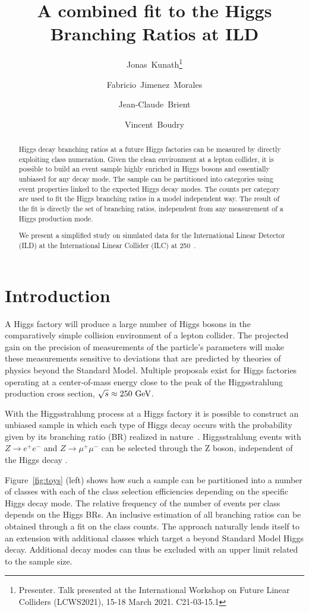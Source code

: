 \documentclass[11pt, hidelinks, a4paper]{scrartcl}
\title{\textbf{A combined fit to the Higgs Branching Ratios at ILD} }
\author{Jonas~Kunath\thanks{Presenter.
    Talk presented at the International Workshop on Future Linear Colliders (LCWS2021),
    15-18 March 2021. C21-03-15.1}
}
\author{Fabricio~Jimenez~Morales}
\author{Jean-Claude~Brient}
\author{Vincent~Boudry}
\affil{Laboratoire Leprince-Ringuet CNRS, \'Ecole Polytechnique,\hspace{2em} Institut Polytechnique de Paris, France}
\date{}
\newcommand{\eV}{\text{e\kern-0.15ex V}\xspace}
\newcommand{\GeV}{\text{G\eV}\xspace}
\begin{document}
\maketitle
\begin{abstract}
Higgs decay branching ratios at a future Higgs factories
can be measured by directly exploiting class numeration.
Given the clean environment at a lepton collider,
it is possible to build an event sample highly enriched in Higgs bosons
and essentially unbiased for any decay mode.
The sample can be partitioned into categories using event properties
linked to the expected Higgs decay modes.
The counts per category are used to fit
the Higgs branching ratios in a model independent way.
The result of the fit is directly the set of branching ratios,
independent from any measurement of a Higgs production mode.

We present a simplified study on simulated data
for the International Linear Detector (ILD)
at the International Linear Collider (ILC) at 250~\GeV.
\end{abstract}

\section{Introduction}
A Higgs factory will produce a large number of Higgs bosons
in the comparatively simple collision environment of a lepton collider.
The projected gain on the precision of measurements of the particle's parameters
will make these measurements sensitive to deviations
that are predicted by theories of physics beyond the Standard Model.
Multiple proposals exist for Higgs factories operating at a center-of-mass energy
close to the peak of the Higgsstrahlung production cross section,
$\sqrt{s}\approx250~\GeV$.

With the Higgsstrahlung process at a Higgs factory
it is possible to construct an unbiased sample
in which each type of Higgs decay occurs with the probability given by
its branching ratio (BR) realized in nature~\cite{HiggsBR_LCWS2019}.
Higgsstrahlung events with $Z \to e^+ e^-$ and $Z \to \mu^+ \mu^-$
can be selected through
the Z boson, independent of the Higgs decay \cite{hRecoilIndependence}.

Figure~\ref{fig:toys} (left) shows how such a sample can be partitioned
into a number of classes with each of the class selection efficiencies depending
on the specific Higgs decay mode.
The relative frequency of the number of events per class
depends on the Higgs BRs.
An inclusive estimation of all branching ratios can be obtained
through a fit on the class counts.
The approach naturally lends itself to an extension with additional classes
which target a beyond Standard Model Higgs decay.
Additional decay modes can thus be excluded
with an upper limit related to the sample size.
\end{document}
